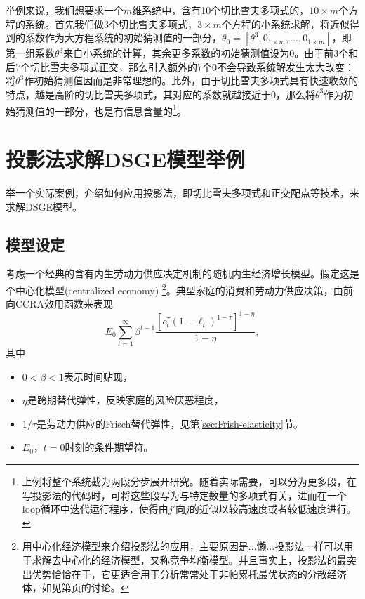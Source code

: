 举例来说，我们想要求一个$m$维系统中，含有10个切比雪夫多项式的，$10 \times m$个方程的系统。首先我们做3个切比雪夫多项式，$3 \times m$个方程的小系统求解，将近似得到的系数作为大方程系统的初始猜测值的一部分，$\theta_{0} = \left[ \theta^{3}, 0_{1 \times m}, \ldots, 0_{1 \times m}\right]$，即第一组系数$\theta^{3}$来自小系统的计算，其余更多系数的初始猜测值设为$0$。由于前3个和后7个切比雪夫多项式正交，那么引入额外的7个$0$不会导致系统解发生太大改变：将$\theta^{3}$作初始猜测值因而是非常理想的。此外，由于切比雪夫多项式具有快速收敛的特点，越是高阶的切比雪夫多项式，其对应的系数就越接近于$0$，那么将$\theta^{3}$作为初始猜测值的一部分，也是有信息含量的\footnote{上例将整个系统截为两段分步展开研究。随着实际需要，可以分为更多段，在写投影法的代码时，可将这些段写为与特定数量的多项式有关，进而在一个loop循环中迭代运行程序，使得由$j'$向$j$的近似以较高速度或者较低速度进行。}。

\section{投影法求解DSGE模型举例}
\label{sec:pj-example-solution-dsge}
举一个实际案例，介绍如何应用投影法，即切比雪夫多项式和正交配点等技术，来求解DSGE模型。

\subsection{模型设定}
\label{sec:pj-example-setup}
考虑一个经典的含有内生劳动力供应决定机制的随机内生经济增长模型。假定这是个中心化模型(centralized economy)
\footnote{
用中心化经济模型来介绍投影法的应用，主要原因是...懒...投影法一样可以用于求解去中心化的经济模型，又称竞争均衡模型。并且事实上，投影法的最突出优势恰恰在于，它更适合用于分析常常处于非帕累托最优状态的分散经济体，如见第\pageref{footnote:pj-solution-approximation-tradeoff}页的讨论。
}。典型家庭的消费和劳动力供应决策，由前向CCRA效用函数来表现
\begin{equation*}
  E_{0} \sum_{t=1}^{\infty} \beta^{t-1} \frac{
  \left[
  c_{t}^{\tau} \left( 1 - \ell_{t} \right)^{1 - \tau}
  \right]^{1 - \eta}
  }{1 - \eta},
\end{equation*}
其中\begin{itemize}
\item $0 < \beta < 1$表示时间贴现，
\item $\eta$是跨期替代弹性，反映家庭的风险厌恶程度，
\item $1/\tau$是劳动力供应的Frisch替代弹性，见第\ref{sec:Frish-elasticity}节。
\item $E_{0}$，$t=0$时刻的条件期望符。
\end{itemize}

